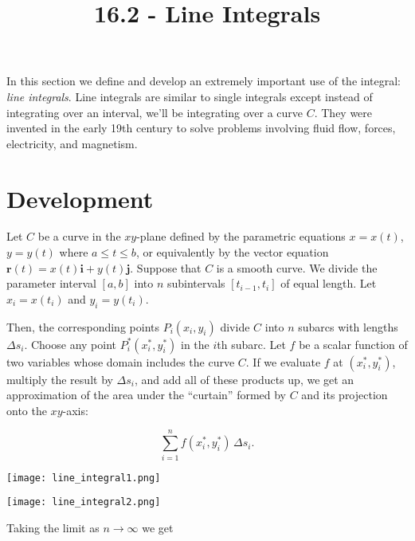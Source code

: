 \documentclass[11pt,oneside,english]{amsart}
\theoremstyle{definition}
\begin{document}
\vspace*{-1cm}
\title{16.2 - Line Integrals}
\maketitle


In this section we define and develop an extremely important use of the integral: \textit{line integrals}. Line integrals are similar to single integrals except instead of integrating over an interval, we'll be integrating over a curve $C$. They were invented in the early 19th century to solve problems involving fluid flow, forces, electricity, and magnetism.

\section*{Development}

Let $C$ be a curve in the $xy$-plane defined by the parametric equations $x=x(t)$, $y=y(t)$ where $a\leq t\leq b$, or equivalently by the vector equation $\mathbf{r}(t)=x(t)\mathbf{i}+y(t)\mathbf{j}$. Suppose that $C$ is a smooth curve. We divide the parameter interval $[a,b]$ into $n$ subintervals $[t_{i-1},t_i]$ of equal length. Let $x_i=x(t_i)$ and $y_i=y(t_i)$.

Then, the corresponding points $P_i(x_i,y_i)$ divide $C$ into $n$ subarcs with lengths $\Delta s_i$. Choose any point $P_i^*(x_i^*,y_i^*)$ in the $i$th subarc. Let $f$ be a scalar function of two variables whose domain includes the curve $C$. If we evaluate $f$ at $(x_i^*,y_i^*)$, multiply the result by $\Delta s_i$, and add all of these products up, we get an approximation of the area under the ``curtain'' formed by $C$ and its projection onto the $xy$-axis:

\[
\sum_{i=1}^nf(x_i^*,y_i^*)\,\Delta s_i.
\]

\begin{minipage}{0.5\textwidth}
\begin{center}
\texttt{[image: line\_integral1.png]}
\end{center}
\end{minipage}%
\begin{minipage}{0.5\textwidth}
\begin{center}
\texttt{[image: line\_integral2.png]}
\end{center}
\end{minipage}

Taking the limit as $n\rightarrow \infty$ we get
\end{document}
